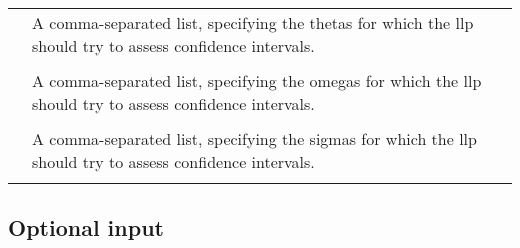 \documentclass[a4paper,12pt]{article}
\begin{document}
\begin{longtable}{p{1in}p{4in}}
\verb%-thetas=<theta number list>% & \\
\nopagebreak
 & A comma-separated list, specifying the thetas for which the llp should try to assess confidence intervals. \\
\\
\verb%-omegas= <omega number list>% & \\
\nopagebreak
 & A comma-separated list, specifying the omegas for which the llp should try to assess confidence intervals. \\
\\
\verb%-sigmas=<sigma number list>% & \\
\nopagebreak
 & A comma-separated list, specifying the sigmas for which the llp should try to assess confidence intervals. \\
\\
\end{longtable}

\subsection{Optional input}
\end{document}
